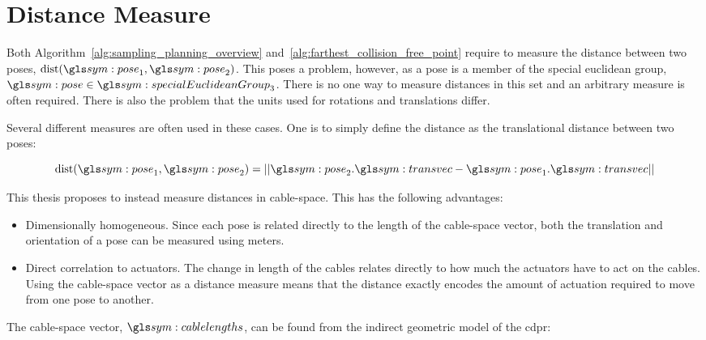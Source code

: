 \section{Distance Measure}%
\label{sec:distance_measure}

	Both Algorithm~\ref{alg:sampling_planning_overview}
	and~\ref{alg:farthest_collision_free_point} require to measure the
	distance between two poses, $\dist(\pose_1, \pose_2)$. This poses a
	problem, however, as a pose is a member of the special euclidean group,
	$\pose \in \specialEuclideanGroup{3}$. There is no one way to measure
	distances in this set and an arbitrary measure is often required. There
	is also the problem that the units used for rotations and translations
	differ.

	Several different measures are often used in these cases. One is to
	simply define the distance as the translational distance between two
	poses:

	\begin{equation}
		\dist(\pose_1, \pose_2) =
			\norm{%
				\pose_2.\transvec - \pose_1.\transvec
			}
		\label{eq:euclidean_distance}
	\end{equation}


	This thesis proposes to instead measure distances in cable-space. This
	has the following advantages:

	\begin{itemize}

		\item

			Dimensionally homogeneous. Since each pose is related directly
			to the length of the cable-space vector, both the translation
			and orientation of a pose can be measured using meters.

		\item

			Direct correlation to actuators. The change in length of the
			cables relates directly to how much the actuators have to act on
			the cables. Using the cable-space vector as a distance measure
			means that the distance exactly encodes the amount of actuation
			required to move from one pose to another.

	\end{itemize}

	The cable-space vector, $\cablelengths$, can be found from the indirect
	geometric model of the \gls{cdpr}:

